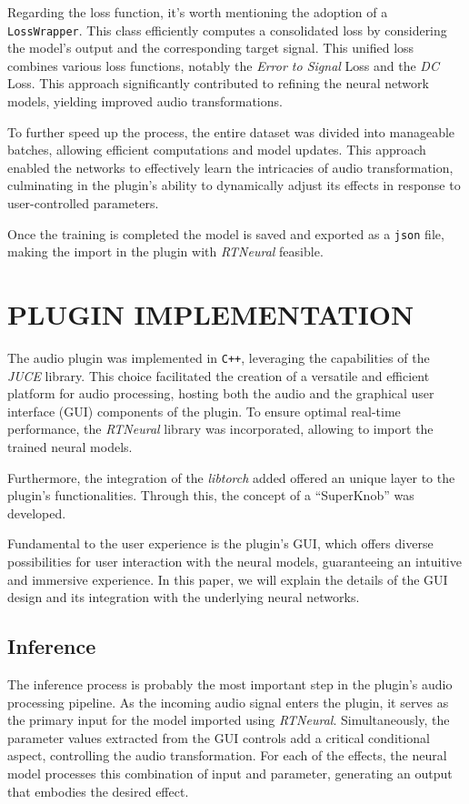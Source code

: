 \documentclass{article}
\newcommand{\quotes}[1]{``#1''}
\begin{document}
\begin{sloppy}
Regarding the loss function, it's worth mentioning the adoption of a \texttt{LossWrapper}. This class efficiently computes a consolidated loss by considering the model's output and the corresponding target signal. This unified loss combines various loss functions, notably the \emph{Error to Signal} Loss and the \emph{DC} Loss. This approach significantly contributed to refining the neural network models, yielding improved audio transformations.

To further speed up the process, the entire dataset was divided into manageable batches, allowing efficient computations and model updates. This approach enabled the networks to effectively learn the intricacies of audio transformation, culminating in the plugin's ability to dynamically adjust its effects in response to user-controlled parameters.

Once the training is completed the model is saved and exported as a \texttt{json} file, making the import in the plugin with \emph{RTNeural} feasible.


\section{PLUGIN IMPLEMENTATION}
\label{sec:pluginInterpretation}
The audio plugin was implemented in \texttt{C++}, leveraging the capabilities of the \emph{JUCE} library. This choice facilitated the creation of a versatile and efficient platform for audio processing, hosting both the audio and the graphical user interface (GUI) components of the plugin. To ensure optimal real-time performance, the \emph{RTNeural} library was incorporated, allowing to import the trained neural models.

Furthermore, the integration of the \emph{libtorch} added offered an unique layer to the plugin's functionalities. Through this, the concept of a \quotes{SuperKnob} was developed.

Fundamental to the user experience is the plugin's GUI, which offers diverse possibilities for user interaction with the neural models, guaranteeing an intuitive and immersive experience. In this paper, we will explain the details of the GUI design and its integration with the underlying neural networks.


\subsection{Inference}
\label{ssec:inference}
The inference process is probably the most important step in the plugin's audio processing pipeline. As the incoming audio signal enters the plugin, it serves as the primary input for the model imported using \emph{RTNeural}. Simultaneously, the parameter values extracted from the GUI controls add a critical conditional aspect, controlling the audio transformation. For each of the effects, the neural model processes this combination of input and parameter, generating an output that embodies the desired effect.


\end{sloppy}
\end{document}
